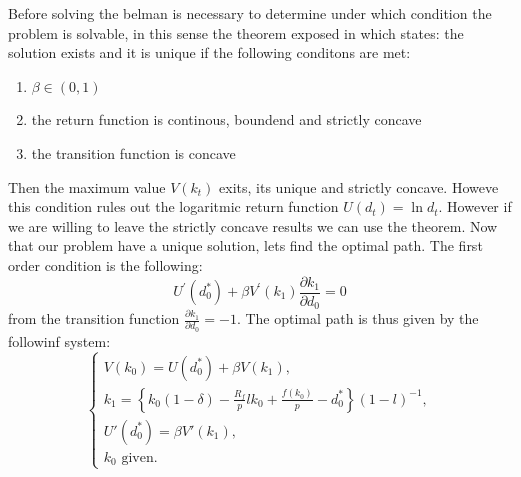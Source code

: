 \documentclass[12pt]{article}
\begin{document}
Before solving the belman is necessary to determine under which condition the problem is solvable, in this sense the
theorem exposed in \cite{PreStoLu89} which states: the solution  exists and it is unique if the following conditons are
met:
\begin{enumerate}
    \item \(\beta \in (0,1)\)
    \item the return function is continous, boundend and strictly concave 
    \item the transition function is concave
\end{enumerate}
Then the maximum value \(V(k_t)\) exits, its unique and strictly concave. Howeve this condition rules out the logaritmic
return function \(U(d_t)=\ln{d_t}\). However if we are willing to leave the strictly concave results we can use the
\cite{THoBru04} theorem.
Now that our problem have a unique solution, lets find the optimal path. The first order condition is the following:
\[U^{\prime}\left(d_0^*\right)+\beta V^{\prime}\left(k_1\right) \frac{\partial k_1}{\partial d_0}=0\]
from the transition function \(\frac{\partial k_1}{\partial d_0}=-1\). The optimal path is thus given by the followinf
system:
\begin{equation}
    \left\{
    \begin{array}{l}
        V\left(k_0\right) = U\left(d_0^*\right) + \beta V\left(k_1\right), \\
        k_1 = \left\{k_0(1 - \delta) - \frac{R_f}{p} l k_0  
+ \frac{f(k_0)}{p} - d^*_0\right\}{\left(1-l\right)}^{-1}, \\ 
        U'\left(d_0^*\right) = \beta V'\left(k_1\right), \\
        k_0 \text{ given.}
    \end{array}
    \right.
\end{equation}
\end{document}
